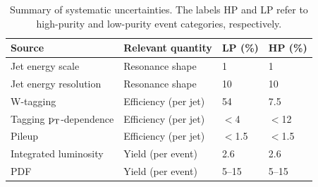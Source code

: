 \begin{table}[]
\begin{center}
  \caption{Summary of systematic uncertainties.  The labels HP and
    LP refer to high-purity and low-purity event categories,
    respectively.}
\begin{tabular}{ llll }
\hline
Source         &  Relevant quantity         & LP (\%)  & HP (\%)   \\
\hline
Jet energy scale       & Resonance shape    & 1  & 1    \\
Jet energy resolution    & Resonance shape    & 10 & 10     \\
W-tagging    & Efficiency (per jet)  & 54 & 7.5  \\
Tagging $\mathrm{p_{T}}$-dependence  & Efficiency (per jet)  & $<$4 & $<$12 \\
Pileup	           & Efficiency (per jet)    & $<$1.5 & $<$1.5    \\
Integrated luminosity    & Yield (per event)    & 2.6  & 2.6  \\
PDF       & Yield (per event)    & 5--15  & 5--15  \\
\hline
\end{tabular}
\label{table:uncertainties}
\end{center}
\end{table}






\clearpage
